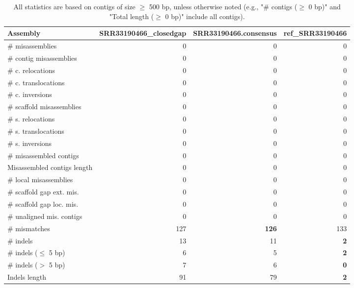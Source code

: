 \documentclass[12pt,a4paper]{article}
\begin{document}
\begin{table}[ht]
\begin{center}
\caption{All statistics are based on contigs of size $\geq$ 500 bp, unless otherwise noted (e.g., "\# contigs ($\geq$ 0 bp)" and "Total length ($\geq$ 0 bp)" include all contigs).}
\begin{tabular}{|l*{3}{|r}|}
\hline
Assembly & SRR33190466\_closedgap & SRR33190466.consensus & ref\_SRR33190466 \\ \hline
\# misassemblies & 0 & 0 & 0 \\ \hline
\hspace{2mm}\# contig misassemblies & 0 & 0 & 0 \\ \hline
\hspace{5mm}\# c. relocations & 0 & 0 & 0 \\ \hline
\hspace{5mm}\# c. translocations & 0 & 0 & 0 \\ \hline
\hspace{5mm}\# c. inversions & 0 & 0 & 0 \\ \hline
\hspace{2mm}\# scaffold misassemblies & 0 & 0 & 0 \\ \hline
\hspace{5mm}\# s. relocations & 0 & 0 & 0 \\ \hline
\hspace{5mm}\# s. translocations & 0 & 0 & 0 \\ \hline
\hspace{5mm}\# s. inversions & 0 & 0 & 0 \\ \hline
\# misassembled contigs & 0 & 0 & 0 \\ \hline
Misassembled contigs length & 0 & 0 & 0 \\ \hline
\# local misassemblies & 0 & 0 & 0 \\ \hline
\# scaffold gap ext. mis. & 0 & 0 & 0 \\ \hline
\# scaffold gap loc. mis. & 0 & 0 & 0 \\ \hline
\# unaligned mis. contigs & 0 & 0 & 0 \\ \hline
\# mismatches & 127 & {\bf 126} & 133 \\ \hline
\# indels & 13 & 11 & {\bf 2} \\ \hline
\hspace{5mm}\# indels ($\leq$ 5 bp) & 6 & 5 & {\bf 2} \\ \hline
\hspace{5mm}\# indels ($>$ 5 bp) & 7 & 6 & {\bf 0} \\ \hline
Indels length & 91 & 79 & {\bf 2} \\ \hline
\end{tabular}
\end{center}
\end{table}
\end{document}
